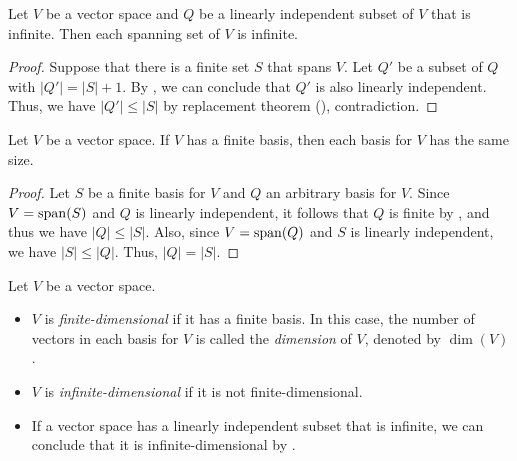\begin{corollary}\label{cor:infinite-dimensional}
  Let $V$ be a vector space and $Q$ be a linearly independent subset of $V$
  that is infinite.
  Then each spanning set of $V$ is infinite.
\end{corollary}
\begin{proof}
  Suppose that there is a finite set $S$ that spans $V$.
  Let $Q'$ be a subset of $Q$ with $|Q'| = |S| + 1$.
  By , we can conclude that $Q'$ is also
  linearly independent.
  Thus, we have $|Q'| \leq |S|$ by replacement theorem
  (), contradiction.
\end{proof}

\begin{corollary}\label{cor:dimension}
  Let $V$ be a vector space.
  If $V$ has a finite basis, then each basis for $V$ has the same size.
\end{corollary}
\begin{proof}
  Let $S$ be a finite basis for $V$ and $Q$ an arbitrary basis for $V$.
  Since $V = \operatorname{span}(S)$ and $Q$ is linearly independent, it follows that $Q$ is
  finite by , and thus we have $|Q| \leq |S|$.
  Also, since $V = \operatorname{span}(Q)$ and $S$ is linearly independent, we have
  $|S| \leq |Q|$.
  Thus, $|Q| = |S|$.
\end{proof}

\begin{definition}\label{def:dimension}
  Let $V$ be a vector space.
  \begin{itemize}
    \item $V$ is \emph{finite-dimensional} if it has a finite basis.
      In this case, the number of vectors in each basis for $V$ is called the
      \emph{dimension} of $V$, denoted by $\dim(V)$.
    \item $V$ is \emph{infinite-dimensional} if it is not finite-dimensional.
  \end{itemize}
\end{definition}

\begin{remark}
  \leavevmode
  \begin{itemize}
    \item If a vector space has a linearly independent subset that is infinite,
      we can conclude that it is infinite-dimensional by
      .
  \end{itemize}
\end{remark}

